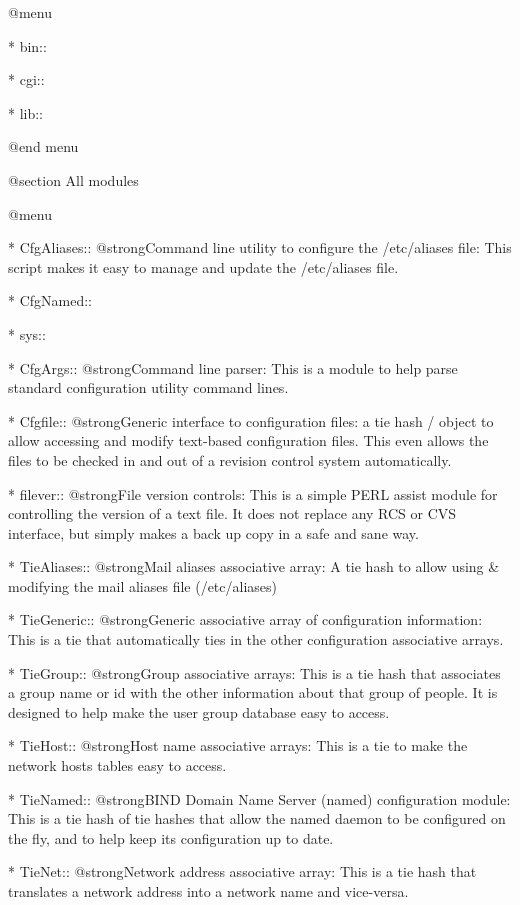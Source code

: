@menu

* bin::	



* cgi::	



* lib::	



@end menu

@section All modules

@menu

* CfgAliases::	@strong{Command line utility to configure the /etc/aliases file:}  This script makes it easy to manage and update the /etc/aliases file. 

* CfgNamed::	

* sys::	

* CfgArgs::	@strong{Command line parser:} This is a module to help parse standard configuration utility command lines. 

* Cfgfile::	@strong{Generic interface to configuration files:} a tie hash / object to allow accessing and modify text-based configuration files.  This even allows the files to be checked in and out of a revision control system automatically. 

* filever::	@strong{File version controls:} This is a simple PERL assist module for controlling the version of a text file.  It does not replace any RCS or CVS interface, but simply makes a back up copy in a safe and sane way. 

* TieAliases::	@strong{Mail aliases associative array:} A tie hash to allow using & modifying the mail aliases file (/etc/aliases) 

* TieGeneric::	@strong{Generic associative array of configuration information:}  This is a tie that automatically ties in the other configuration associative arrays. 

* TieGroup::	@strong{Group associative arrays:} This is a tie hash that associates a group name or id with the other information about that group of people.  It is designed to help make the user group database easy to access. 

* TieHost::	@strong{Host name associative arrays:} This is a tie to make the network hosts tables easy to access. 

* TieNamed::	@strong{BIND Domain Name Server (named) configuration module:} This is a tie hash of tie hashes that allow the named daemon to be configured on the fly, and to help keep its configuration up to date. 

* TieNet::	@strong{Network address associative array:} This is a tie hash that translates a network address into a network name and vice-versa. 

